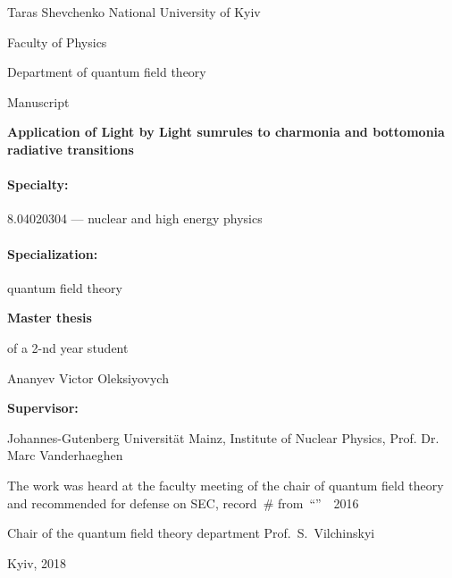 \begin{titlepage}

    \begin{center}
        Taras Shevchenko National University of Kyiv

        Faculty of Physics

        Department of quantum field theory
    \end{center}

    \begin{flushright}
        Manuscript
    \end{flushright}

    \vfill

    \begin{center}
        \textbf{Application of Light by Light sumrules to charmonia and bottomonia radiative transitions}
    \end{center}

    \vfill

    \paragraph{Specialty:} 8.04020304 --- nuclear and high energy physics

    \paragraph{Specialization:} quantum field theory

    \hfill\parbox[t]{8cm}{
        \textbf{Master thesis}

        of a 2-nd year student

        Ananyev Victor Oleksiyovych
    }

    \vspace{1cm}

    \hfill\parbox[t]{8cm}{
        \textbf{Supervisor:}

        Johannes-Gutenberg Universität Mainz,
        Institute of Nuclear Physics,
        Prof. Dr. Marc Vanderhaeghen
    }

    \vfill

    {\small
        \noindent The work was heard at the faculty meeting of the chair of quantum field theory and recommended for defense on SEC, record~\# from~``''~~2016

        \vspace{0.5cm}

        \noindent Chair of the quantum field theory department \hfill  Prof.~S.~Vilchinskyi
    }

    \vspace{0.8cm}

    \begin{center}
        Kyiv, 2018
    \end{center}
\end{titlepage}
